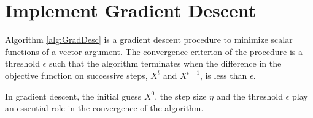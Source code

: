 \documentclass{article}
\begin{document}
 


\section{Implement Gradient Descent}

Algorithm \ref{alg:GradDesc} is a gradient descent procedure to minimize scalar functions of a vector argument. The convergence criterion of the procedure is a threshold $\epsilon$ such that the algorithm terminates when the difference in the objective function on successive steps, $X^t$ and $X^{t+1}$, is less than $\epsilon$.

In gradient descent, the initial guess $X^0$, the step size $\eta$ and the threshold $\epsilon$ play an essential role in the convergence of the algorithm.



\begin{table}[t]
\caption{Number of iterations for convergence and final value of the objective function for different values of the step, threshold and initial guess.}
\label{GradInitialCond}
\begin{center}
\begin{small}
\begin{sc}
\end{sc}
\end{small}
\end{center}
\vskip -0.1in
\end{table}
\end{document}
